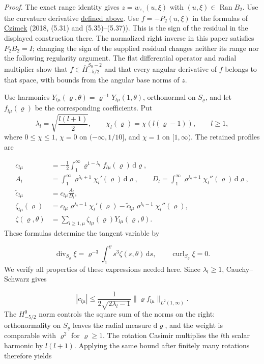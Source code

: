\documentclass[
  english,
  11pt,
  reqno]{amsart}
\begin{document}
\emph{Proof.} The exact range identity gives
\(z=w_{\varepsilon_\gamma}(u,\xi)\) with
\((u,\xi)\in\operatorname{Ran}B_2\). Use the curvature derivative
\hyperref[eq:online-extension-scalar-flat-operator]{defined above}. Use
\(f=-P_2(u,\xi)\) in the formulas of \hyperref[ref-Czimek2018]{Czimek}
(2018, (5.31) and (5.35)--(5.37)). This is the sign of the residual in
the displayed construction there. The normalized right inverse in this
paper satisfies \(P_2B_2=I\); changing the sign of the supplied residual
changes neither its range nor the following regularity argument. The
flat differential operator and radial multiplier show that
\(f\in\overline H^{S_0-2}_{-5/2}\) and that every angular derivative of
\(f\) belongs to that space, with bounds from the angular base norms of
\(z\).

Use harmonics
\(Y_{l\mu}(\varrho,\theta)=\varrho^{-1}Y_{l\mu}(1,\theta)\), orthonormal
on \(S_\varrho\), and let \(f_{l\mu}(\varrho)\) be the corresponding
coefficients. Put \[
\lambda_l=\sqrt{\frac{l(l+1)}2},
\qquad \chi_l(\varrho)=\chi(l(\varrho-1)),
\qquad l\ge1,
\] where \(0\le\chi\le1\), \(\chi=0\) on \((-\infty,1/10]\), and
\(\chi=1\) on \([1,\infty)\). The retained profiles are

\label{eq:online-extension-scalar-moment-profiles} \[
\begin{aligned}
c_{l\mu}
&=-\frac12\int_1^\infty
\varrho^{1-\lambda_l}f_{l\mu}(\varrho)\,\mathrm d\varrho,\\
A_l&=\int_1^\infty
\varrho^{\lambda_l+1}\chi_l'(\varrho)\,\mathrm d\varrho,
\qquad
D_l=\int_1^\infty
\varrho^{\lambda_l+1}\chi_l''(\varrho)\,\mathrm d\varrho,\\
\widetilde c_{l\mu}&=c_{l\mu}\frac{A_l}{D_l},\\
\zeta_{l\mu}(\varrho)
&=c_{l\mu}\varrho^{\lambda_l-1}\chi_l'(\varrho)
-\widetilde c_{l\mu}\varrho^{\lambda_l-1}\chi_l''(\varrho),\\
\zeta(\varrho,\theta)
&=\sum_{l\ge1,\mu}
\zeta_{l\mu}(\varrho)Y_{l\mu}(\varrho,\theta).
\end{aligned}
\] These formulas determine the tangent variable by

\label{eq:online-extension-scalar-tangent-hodge-equation}
\[
\operatorname{div}_{S_\varrho}\xi
=\varrho^{-3}\int_1^\varrho s^3\zeta(s,\theta)\,\mathrm ds,
\qquad
\operatorname{curl}_{S_\varrho}\xi=0.
\] We verify all properties of these expressions needed here. Since
\(\lambda_l\ge1\), Cauchy--Schwarz gives

\label{eq:online-extension-scalar-moment-bound} \[
|c_{l\mu}|\le
\frac{1}{2\sqrt{2\lambda_l-1}}
\|\varrho f_{l\mu}\|_{L^2(1,\infty)}.
\] The \(H^0_{-5/2}\) norm controls the square sum of the norms on the
right: orthonormality on \(S_\varrho\) leaves the radial measure
\(\mathrm d\varrho\), and the weight is comparable with \(\varrho^2\)
for \(\varrho\ge1\). The rotation Casimir multiplies the \(l\)th scalar
harmonic by \(l(l+1)\). Applying the same bound after finitely many
rotations therefore yields
\end{document}
